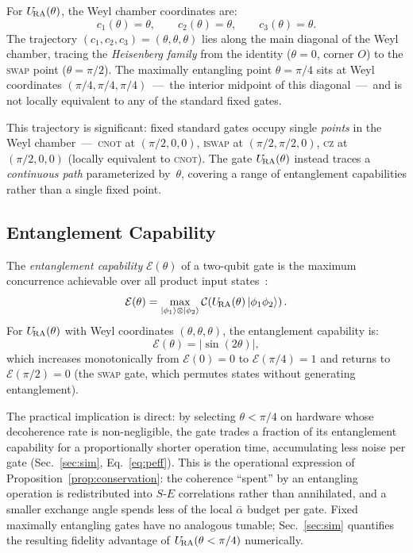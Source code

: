 For $U_{\!\mathrm{RA}}(\theta)$, the Weyl chamber coordinates are:
\begin{equation}
  c_1(\theta) = \theta, \qquad
  c_2(\theta) = \theta, \qquad
  c_3(\theta) = \theta.
  \label{eq:weyl-coords}
\end{equation}
The trajectory $(c_1, c_2, c_3) = (\theta, \theta, \theta)$ lies along the
main diagonal of the Weyl chamber, tracing the \emph{Heisenberg family} from the
identity ($\theta = 0$, corner $O$) to the \textsc{swap} point ($\theta = \pi/2$).
The maximally entangling point $\theta = \pi/4$ sits at Weyl coordinates
$(\pi/4, \pi/4, \pi/4)$~---~the interior midpoint of this diagonal~---~and is
not locally equivalent to any of the standard fixed gates.

This trajectory is significant: fixed standard gates occupy single
\emph{points} in the Weyl chamber~---~\textsc{cnot} at $(\pi/2, 0, 0)$,
\textsc{iswap} at $(\pi/2, \pi/2, 0)$, \textsc{cz} at $(\pi/2, 0, 0)$
(locally equivalent to \textsc{cnot}).
The gate $U_{\!\mathrm{RA}}(\theta)$ instead traces a \emph{continuous path} parameterized
by~$\theta$, covering a range of entanglement capabilities rather than a
single fixed point.

\subsection{Entanglement Capability}
\label{subsec:entcap}

The \emph{entanglement capability} $\mathcal{E}(\theta)$ of a two-qubit gate
is the maximum concurrence achievable over all product input
states~\cite{Zhang2003WeylChamber}:
\begin{equation}
  \mathcal{E}(\theta) = \max_{\ket{\phi_1}\otimes\ket{\phi_2}}
    \mathcal{C}\!\left(U_{\!\mathrm{RA}}(\theta)\ket{\phi_1\phi_2}\right).
  \label{eq:entcap}
\end{equation}
For $U_{\!\mathrm{RA}}(\theta)$ with Weyl coordinates $(\theta, \theta, \theta)$,
the entanglement capability is:
\begin{equation}
  \mathcal{E}(\theta) = |\sin(2\theta)|,
  \label{eq:entcap-result}
\end{equation}
which increases monotonically from $\mathcal{E}(0) = 0$ to
$\mathcal{E}(\pi/4) = 1$ and returns to $\mathcal{E}(\pi/2) = 0$
(the \textsc{swap} gate, which permutes states without generating entanglement).

The practical implication is direct: by selecting $\theta < \pi/4$ on
hardware whose decoherence rate is non-negligible, the gate trades a
fraction of its entanglement capability for a proportionally shorter
operation time, accumulating less noise per gate
(Sec.~\ref{sec:sim}, Eq.~\eqref{eq:peff}).
This is the operational expression of
Proposition~\ref{prop:conservation}: the coherence ``spent'' by an
entangling operation is redistributed into $S$-$E$ correlations rather
than annihilated, and a smaller exchange angle spends less of the local
$\bar\alpha$ budget per gate.
Fixed maximally entangling gates have no analogous tunable;
Sec.~\ref{sec:sim} quantifies the resulting fidelity advantage of
$U_{\!\mathrm{RA}}(\theta < \pi/4)$ numerically.
